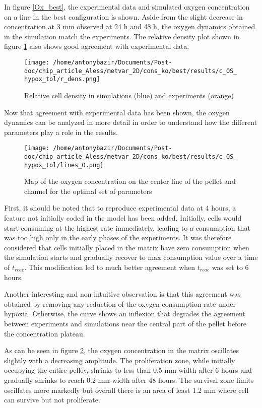 \documentclass[11pt,a4paper]{article}
\begin{document}
In figure \ref{Ox_best}, the experimental data and simulated oxygen concentration on a line in the best configuration is shown. Aside from the slight decrease in concentration at 3 mm observed at 24 h and 48 h, the oxygen dynamics obtained in the simulation match the experiments. The relative density plot shown in figure \ref{density_best} also shows good agreement with experimental data.

\begin{figure}[ht!]
\centering
\texttt{[image: /home/antonybazir/Documents/Post-doc/chip\_article\_Aless/metvar\_2D/cons\_ko/best/results/c\_OS\_hypox\_tol/r\_dens.png]}
\caption{Relative cell density in simulations (blue) and experiments (orange) \label{density_best}}
\end{figure}

Now that agreement with experimental data has been shown, the oxygen dynamics can be analyzed in more detail in order to understand how the different parameters play a role in the results.

\begin{figure}[ht!]
\centering
\texttt{[image: /home/antonybazir/Documents/Post-doc/chip\_article\_Aless/metvar\_2D/cons\_ko/best/results/c\_OS\_hypox\_tol/lines\_O.png]}
\caption{ Map of the oxygen concentration on the center line of the pellet and channel for the optimal set of parameters \label{best_map}}
\end{figure}

First, it should be noted that to reproduce experimental data at 4 hours, a feature not initially coded in the model has been added. Initially, cells would start consuming at the highest rate immediately, leading to a consumption that was too high only in the early phases of the experiments. It was therefore considered that cells initially placed in the matrix have zero consumption  when the simulation starts and gradually recover to max consumption value over a time of $t_{reac}$. This modification led to much better agreement when $t_{reac}$ was set to 6 hours.

Another interesting and non-intuitive observation is that this agreement was obtained by removing any reduction of the oxygen consumption rate under hypoxia. Otherwise, the curve shows an inflexion that degrades the agreement between experiments and simulations near the central part of the pellet before the concentration plateau.

As can be seen in figure \ref{best_map}, the oxygen concentration in the matrix oscillates slightly with a decreasing amplitude. The proliferation zone, while initially occupying the entire pelley, shrinks to less than 0.5 mm-width after 6 hours and gradually shrinks to reach 0.2 mm-width after 48 hours. The survival zone limits oscillates more markedly but overall there is an area of least 1.2 mm where cell can survive but not proliferate. 
\end{document}
